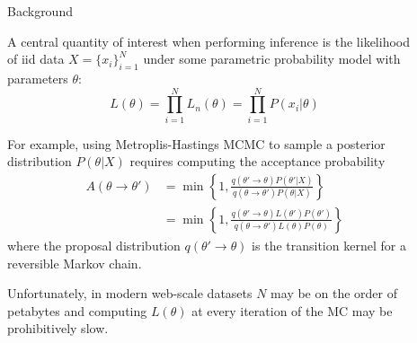 \documentclass[final]{beamer}
\newlength{\sepwid}
\newlength{\onecolwid}
\newlength{\twocolwid}
\begin{document}
\begin{frame}[t]
\begin{columns}[t]
\begin{column}{\onecolwid}
\begin{block}{Background}

A central quantity of interest when performing inference is the likelihood of
iid data $X = \{x_i\}_{i=1}^N$ under some parametric probability model with
parameters $\theta$:
\begin{equation}
  \label{eq:lik}
  L(\theta) = \prod_{i=1}^N L_n(\theta) = \prod_{i=1}^N P(x_i | \theta)
\end{equation}

For example, using Metroplis-Hastings MCMC to sample a posterior
distribution $P(\theta | X)$ requires computing the acceptance probability
\begin{align}
  A(\theta \to \theta')
  &= \min \left\{
      1,
      \frac{q(\theta' \to \theta) P(\theta'|X)}{q(\theta \to \theta') P(\theta | X)}
    \right\}\\
  &= \min \left\{
      1,
      \frac{q(\theta' \to \theta) L(\theta')P(\theta')}{q(\theta \to \theta') L(\theta)P(\theta)}
    \right\}
\end{align}
where the proposal distribution $q(\theta' \to \theta)$ is the transition
kernel for a reversible Markov chain.

Unfortunately, in modern web-scale datasets $N$ may be on the order of
petabytes and computing $L(\theta)$ at every iteration of the MC may
be prohibitively slow.

\end{block}


\end{column} %

\begin{column}{\sepwid}\end{column} %

\begin{column}{\twocolwid} %

\begin{columns}[t,totalwidth=\twocolwid] %

\begin{column}{\onecolwid}\vspace{-.6in} %



\end{column}
\end{columns}
\end{column}
\end{columns}
\end{frame}
\end{document}
